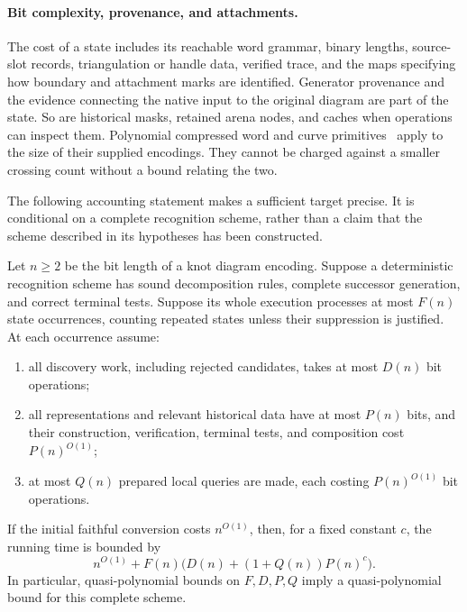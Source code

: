 \paragraph{Bit complexity, provenance, and attachments.}
The cost of a state includes its reachable word grammar, binary lengths,
source-slot records, triangulation or handle data, verified trace, and
the maps specifying how boundary and attachment marks are identified.
Generator provenance and the evidence connecting the native input to the
original diagram are part of the state. So are historical masks, retained
arena nodes, and caches when operations can inspect them. Polynomial
compressed word and curve primitives~\cite{schleimer,lackenby-curves}
apply to the size of their supplied encodings. They cannot be charged
against a smaller crossing count without a bound relating the two.

The following accounting statement makes a sufficient target precise. It
is conditional on a complete recognition scheme, rather than a claim that
the scheme described in its hypotheses has been constructed.

\begin{proposition}
\label{prop:qp-accounting}
Let $n\ge2$ be the bit length of a knot diagram encoding. Suppose a
deterministic recognition scheme has sound decomposition rules, complete
successor generation, and correct terminal tests. Suppose its whole
execution processes at most $F(n)$ state occurrences, counting repeated
states unless their suppression is justified. At each occurrence assume:
\begin{enumerate}
\item all discovery work, including rejected candidates, takes at most
      $D(n)$ bit operations;
\item all representations and relevant historical data have at most
      $P(n)$ bits, and their construction, verification, terminal tests,
      and composition cost $P(n)^{O(1)}$;
\item at most $Q(n)$ prepared local queries are made, each costing
      $P(n)^{O(1)}$ bit operations.
\end{enumerate}
If the initial faithful conversion costs $n^{O(1)}$, then, for a fixed
constant $c$, the running time is bounded by
\[
 n^{O(1)}+F(n)\bigl(D(n)+(1+Q(n))P(n)^c\bigr).
 \tag{A}\label{eq:global-accounting}
\]
In particular, quasi-polynomial bounds on $F,D,P,Q$ imply a
quasi-polynomial bound for this complete scheme.
\end{proposition}

